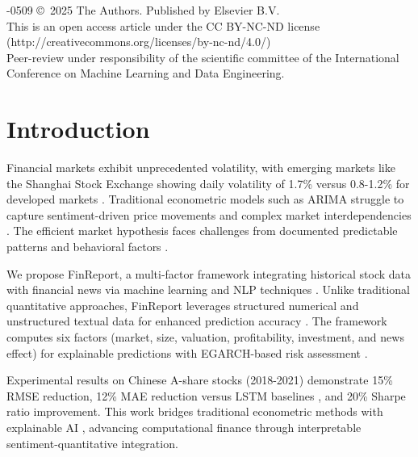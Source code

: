 \documentclass[3p,times,procedia]{elsarticle}
\begin{document}
\vspace{6pt}
-0509 \copyright\ 2025 The Authors. Published by Elsevier B.V.\\
This is an open access article under the CC BY-NC-ND license (http://creativecommons.org/licenses/by-nc-nd/4.0/)\\
Peer-review under responsibility of the scientific committee of the International Conference on Machine Learning and Data Engineering.

\vspace{12pt}

\section{Introduction}
\label{main}

Financial markets exhibit unprecedented volatility, with emerging markets like the Shanghai Stock Exchange showing daily volatility of 1.7\% versus 0.8-1.2\% for developed markets \cite{Poon2003,Chen2015}. Traditional econometric models such as ARIMA \cite{Box1970} struggle to capture sentiment-driven price movements and complex market interdependencies \cite{FAMA1993,Malkiel2003}. The efficient market hypothesis faces challenges from documented predictable patterns and behavioral factors \cite{Sharpe1964,Chen2015}.

We propose FinReport, a multi-factor framework integrating historical stock data with financial news via machine learning and NLP techniques \cite{hochreiter1997lstm,Bao2017}. Unlike traditional quantitative approaches, FinReport leverages structured numerical and unstructured textual data for enhanced prediction accuracy \cite{Schumaker2009,Xing2018}. The framework computes six factors (market, size, valuation, profitability, investment, and news effect) for explainable predictions with EGARCH-based risk assessment \cite{Nelson1991,Engle1982}.

Experimental results on Chinese A-share stocks (2018-2021) \cite{FinReportDataset2025} demonstrate 15\% RMSE reduction, 12\% MAE reduction versus LSTM baselines \cite{Fischer2018}, and 20\% Sharpe ratio improvement. This work bridges traditional econometric methods with explainable AI \cite{TETLOCK2007,Ribeiro2016}, advancing computational finance through interpretable sentiment-quantitative integration.
\end{document}
